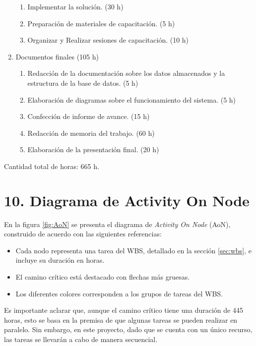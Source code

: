 \documentclass[
11pt, %
]{charter}
\begin{document}
\begin{enumerate}
\begin{enumerate}
	\item Implementar la solución. (30 h)
	\item Preparación de materiales de capacitación. (5 h)
	\item Organizar y Realizar sesiones de capacitación. (10 h)
	\end{enumerate}
\item Documentos finales (105 h)
	\begin{enumerate}
	\item Redacción de la documentación sobre los datos almacenados y la estructura de la base de datos. (5 h)
	\item Elaboración de diagramas sobre el funcionamiento del sistema. (5 h)
	\item Confección de informe de avance. (15 h)
	\item Redacción de memoria del trabajo. (60 h)
	\item Elaboración de la presentación final. (20 h)
	\end{enumerate}
\end{enumerate}

Cantidad total de horas: 665 h.

\section{10. Diagrama de Activity On Node}
\label{sec:AoN}

En la figura \ref{fig:AoN} se presenta el diagrama de \textit{Activity On Node} (AoN), construido de acuerdo con las siguientes referencias:

\begin{itemize}
\item Cada nodo representa una tarea del WBS, detallado en la sección \ref{sec:wbs}, e incluye su duración en horas.
\item El camino crítico está destacado con flechas más gruesas.
\item Los diferentes colores corresponden a los grupos de tareas del WBS.
\end{itemize}

Es importante aclarar que, aunque el camino crítico tiene una duración de 445 horas, esto se basa en la premisa de que algunas tareas se pueden realizar en paralelo. Sin embargo, en este proyecto, dado que se cuenta con un único recurso, las tareas se llevarán a cabo de manera secuencial.
\end{document}

